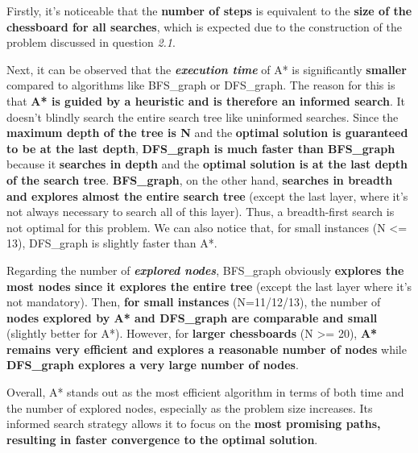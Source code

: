 \documentclass[11pt,a4paper]{report}
\begin{document}
\begin{answers}[8cm]
\small{Firstly, it's noticeable that the \textbf{number of steps} is equivalent to the \textbf{size of the chessboard for all searches}, which is expected due to the construction of the problem discussed in question \textit{2.1}.

Next, it can be observed that the \textbf{\textit{execution time}} of A* is significantly \textbf{smaller} compared to algorithms like BFS\_graph or DFS\_graph. The reason for this is that \textbf{A* is guided by a heuristic and is therefore an informed search}. It doesn't blindly search the entire search tree like uninformed searches. Since the \textbf{maximum depth of the tree is N} and the \textbf{optimal solution is guaranteed to be at the last depth}, \textbf{DFS\_graph is much faster than BFS\_graph} because it \textbf{searches in depth} and the \textbf{optimal solution is at the last depth of the search tree}. \textbf{BFS\_graph}, on the other hand, \textbf{searches in breadth and explores almost the entire search tree} (except the last layer, where it's not always necessary to search all of this layer). Thus, a breadth-first search is not optimal for this problem. We can also notice that, for small instances (N <= 13), DFS\_graph is slightly faster than A*.

Regarding the number of \textbf{\textit{explored nodes}}, BFS\_graph obviously \textbf{explores the most nodes since it explores the entire tree} (except the last layer where it's not mandatory). Then, \textbf{for small instances} (N=11/12/13), the number of \textbf{nodes explored by A* and DFS\_graph are comparable and small} (slightly better for A*). However, for \textbf{larger chessboards} (N >= 20), \textbf{A* remains very efficient and explores a reasonable number of nodes} while \textbf{DFS\_graph explores a very large number of nodes}.

Overall, A* stands out as the most efficient algorithm in terms of both time and the number of explored nodes, especially as the problem size increases. Its informed search strategy allows it to focus on the \textbf{most promising paths, resulting in faster convergence to the optimal solution}.}
\end{answers}

~ 
\end{document}
